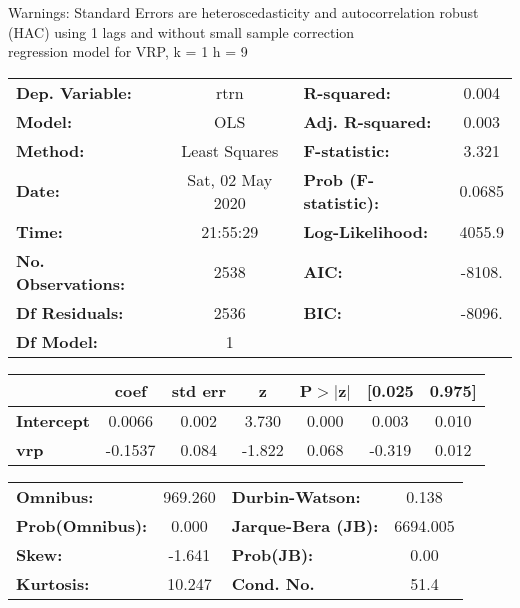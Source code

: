 Warnings: \newline
 [1] Standard Errors are heteroscedasticity and autocorrelation robust (HAC) using 1 lags and without small sample correction\\ 

regression model for VRP, k = 1 h = 9\begin{center}
\begin{tabular}{lclc}
\toprule
\textbf{Dep. Variable:}    &       rtrn       & \textbf{  R-squared:         } &     0.004   \\
\textbf{Model:}            &       OLS        & \textbf{  Adj. R-squared:    } &     0.003   \\
\textbf{Method:}           &  Least Squares   & \textbf{  F-statistic:       } &     3.321   \\
\textbf{Date:}             & Sat, 02 May 2020 & \textbf{  Prob (F-statistic):} &   0.0685    \\
\textbf{Time:}             &     21:55:29     & \textbf{  Log-Likelihood:    } &    4055.9   \\
\textbf{No. Observations:} &        2538      & \textbf{  AIC:               } &    -8108.   \\
\textbf{Df Residuals:}     &        2536      & \textbf{  BIC:               } &    -8096.   \\
\textbf{Df Model:}         &           1      & \textbf{                     } &             \\
\bottomrule
\end{tabular}
\begin{tabular}{lcccccc}
                   & \textbf{coef} & \textbf{std err} & \textbf{z} & \textbf{P$> |$z$|$} & \textbf{[0.025} & \textbf{0.975]}  \\
\midrule
\textbf{Intercept} &       0.0066  &        0.002     &     3.730  &         0.000        &        0.003    &        0.010     \\
\textbf{vrp}       &      -0.1537  &        0.084     &    -1.822  &         0.068        &       -0.319    &        0.012     \\
\bottomrule
\end{tabular}
\begin{tabular}{lclc}
\textbf{Omnibus:}       & 969.260 & \textbf{  Durbin-Watson:     } &    0.138  \\
\textbf{Prob(Omnibus):} &   0.000 & \textbf{  Jarque-Bera (JB):  } & 6694.005  \\
\textbf{Skew:}          &  -1.641 & \textbf{  Prob(JB):          } &     0.00  \\
\textbf{Kurtosis:}      &  10.247 & \textbf{  Cond. No.          } &     51.4  \\
\bottomrule
\end{tabular}
\end{center}

